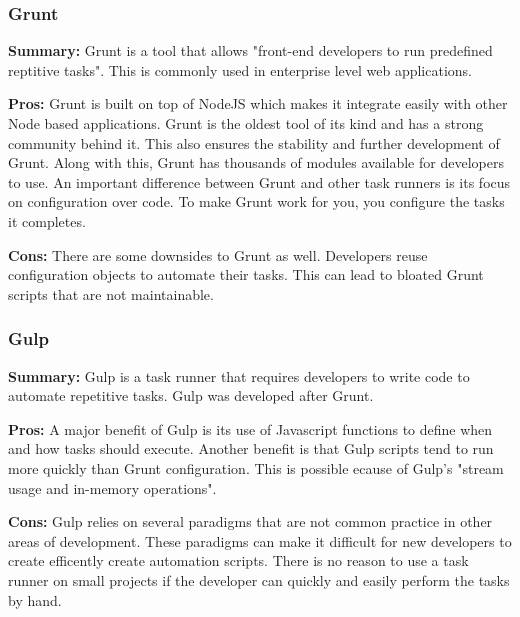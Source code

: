 \documentclass[draftclsnofoot,onecolumn,letterpaper,10pt,compsoc]{IEEEtran}
\begin{document}
  			\subsubsection{Grunt}
		        \textbf{Summary:}
		            Grunt is a tool that allows "front-end developers to run predefined reptitive tasks"\cite{TaskRunners}. This is commonly used in enterprise level web applications.

		        \noindent \textbf{Pros:}
		            Grunt is built on top of NodeJS which makes it integrate easily with other Node based applications.
		            Grunt is the oldest tool of its kind and has a strong community behind it.
		            This also ensures the stability and further development of Grunt.
		            Along with this, Grunt has thousands of modules available for developers to use.
		            An important difference between Grunt and other task runners is its focus on configuration over code.
		            To make Grunt work for you, you configure the tasks it completes.

		        \noindent \textbf{Cons:}
		            There are some downsides to Grunt as well.
		            Developers reuse configuration objects to automate their tasks.
		            This can lead to bloated Grunt scripts that are not maintainable\cite{TaskRunners}.

  			\subsubsection{Gulp}
		        \textbf{Summary:}
		            Gulp is a task runner that requires developers to write code to automate repetitive tasks\cite{TaskRunners}.
		            Gulp was developed after Grunt.

		        \noindent \textbf{Pros:}
		            A major benefit of Gulp is its use of Javascript functions to define when and how tasks should execute.
		            Another benefit is that Gulp scripts tend to run more quickly than Grunt configuration\cite{GulpGruntSpeed}.
		            This is possible ecause of Gulp's "stream usage and in-memory operations"\cite{TaskRunners}.

		        \noindent \textbf{Cons:}
		            Gulp relies on several paradigms that are not common practice in other areas of development.
		            These paradigms can make it difficult for new developers to create efficently create automation scripts.
		            There is no reason to use a task runner on small projects if the developer can quickly and easily perform the tasks by hand.
\end{document}

